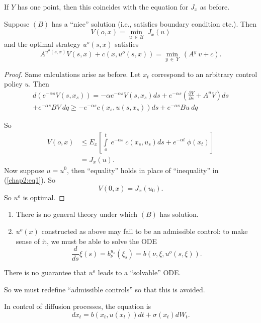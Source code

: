 If $Y$ has one point, then this coincides with the equation for $J_x$
as before. 

\begin{proposition}%
  Suppose $(B)$ has a ``nice'' solution (i.e., satisfies boundary
  condition etc.). Then 
  $$
  V(o,x) = \min_{u ~ \in  ~ \mathscr{U}} ~ J_x(u)
  $$
  and the optimal strategy $u^o(s,x)$ satisfies
  $$
  A^{u^o(s,x)}V(s,x) + c(x,u^o(s,x)) = \min_{y ~\in  ~ Y} ~ (A^y ~ v+c).
  $$
\end{proposition}

\begin{proof}
  Same calculations arise as before. Let $x_t$ correspond to an
  arbitrary control policy $u$. Then  
  \begin{multline*}
    d(e^{-\alpha s}V(s,x_s)) = -\alpha e^{-\alpha s}V(s,x_s)ds +
    e^{-\alpha s} \left(\frac{\partial V}{\partial s} + A ^{u}V\right)ds \\
    + e^{-\alpha s}BV~dq \ge -e^{-\alpha s}c(x_s,u(s,x_s))ds +
    e^{-\alpha s}Bu~dq \tag{1}\label{chap2:eq1} 
  \end{multline*}

So\pageoriginale
\begin{align*}
  V(o,x) & \le E_x\left[\int\limits_o^t ~e^{-\alpha s} ~ c(x_s,u_s)ds +
    e^{-\alpha t} ~ \phi (x_t)\right]\\ 
  & = J_x(u).
\end{align*}
Now suppose $u=u^0$, then ``equality'' holds in place of
``inequality'' in (\ref{chap2:eq1}). So 
$$
V(0, x)=J_x(u_0).
$$
So $u^o$ is optimal.
\end{proof}

\medskip
{}
\begin{enumerate}
\renewcommand{\labelenumi}{(\theenumi)}
\item There is no general theory under which $(B)$ has solution.

\item $u^o(x)$ constructed as above may fail to be an admissible
  control: to make sense of it, we must be able to solve the ODE 
  $$
  \frac{d}{ds}\xi(s) = b^{u_o}_\nu(\xi_s) = b(\nu,\xi,u^o(s,\xi)).
  $$
\end{enumerate}

There is no guarantee that $u^o$ leads to a ``solvable'' ODE.

So we must redefine ``admissible controls'' so that this is avoided.

\begin{rem}%
  In control of diffusion processes, the equation is 
  $$
  dx_t = b(x_t,u(x_t))dt + \sigma(x_t)dW_t.
  $$
\end{rem}

